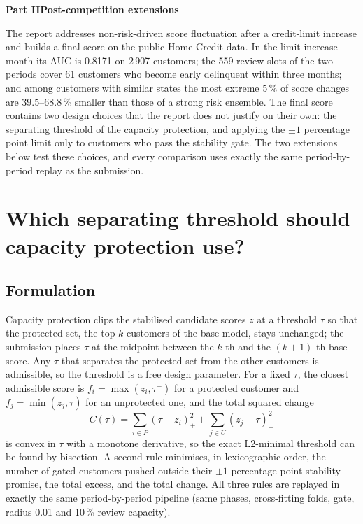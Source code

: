 \clearpage
{}

\setcounter{page}{1}
\begin{center}{\Large\bfseries Part II\quad Post-competition extensions}\end{center}

The report addresses non-risk-driven score fluctuation after a credit-limit increase and builds a final score on the public Home Credit data\cite{homecredit}. In the limit-increase month its AUC is 0.8171 on 2\,907 customers; the 559 review slots of the two periods cover 61 customers who become early delinquent within three months; and among customers with similar states the most extreme 5\,\% of score changes are 39.5--68.8\,\% smaller than those of a strong risk ensemble. The final score contains two design choices that the report does not justify on their own: the separating threshold of the capacity protection, and applying the $\pm1$ percentage point limit only to customers who pass the stability gate. The two extensions below test these choices, and every comparison uses exactly the same period-by-period replay as the submission.

\section{Which separating threshold should capacity protection use?}

\subsection{Formulation}
Capacity protection clips the stabilised candidate scores $z$ at a threshold $\tau$ so that the protected set, the top $k$ customers of the base model, stays unchanged; the submission places $\tau$ at the midpoint between the $k$-th and the $(k+1)$-th base score. Any $\tau$ that separates the protected set from the other customers is admissible, so the threshold is a free design parameter. For a fixed $\tau$, the closest admissible score is $f_i=\max(z_i,\tau^+)$ for a protected customer and $f_j=\min(z_j,\tau)$ for an unprotected one, and the total squared change
\begin{equation}
C(\tau)=\sum_{i\in P}(\tau-z_i)_+^2+\sum_{j\in U}(z_j-\tau)_+^2
\end{equation}
is convex in $\tau$ with a monotone derivative, so the exact L2-minimal threshold can be found by bisection. A second rule minimises, in lexicographic order, the number of gated customers pushed outside their $\pm1$ percentage point stability promise, the total excess, and the total change. All three rules are replayed in exactly the same period-by-period pipeline (same phases, cross-fitting folds, gate, radius 0.01 and 10\,\% review capacity).

